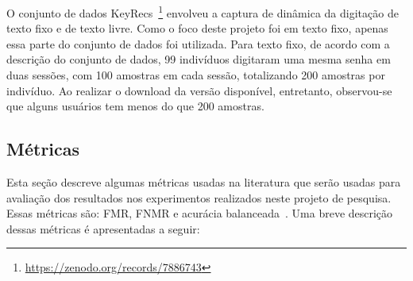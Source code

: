 O conjunto de dados KeyRecs~\footnote{\url{https://zenodo.org/records/7886743}} envolveu a captura de dinâmica da digitação de texto fixo e de texto livre. Como o foco deste projeto foi em texto fixo, apenas essa parte do conjunto de dados foi utilizada. Para texto fixo, de acordo com a descrição do conjunto de dados, 99 indivíduos digitaram uma mesma senha em duas sessões, com 100 amostras em cada sessão, totalizando 200 amostras por indivíduo. Ao realizar o download da versão disponível, entretanto, observou-se que alguns usuários tem menos do que 200 amostras.


\subsection{Métricas}\label{subsec:metricas}

Esta seção descreve algumas métricas usadas na literatura que serão usadas para avaliação dos resultados nos experimentos realizados neste projeto de pesquisa. Essas métricas são: FMR, FNMR e acurácia balanceada~\cite{Precise2014, Ferlini2021eargate}. Uma breve descrição dessas métricas é apresentadas a seguir:

